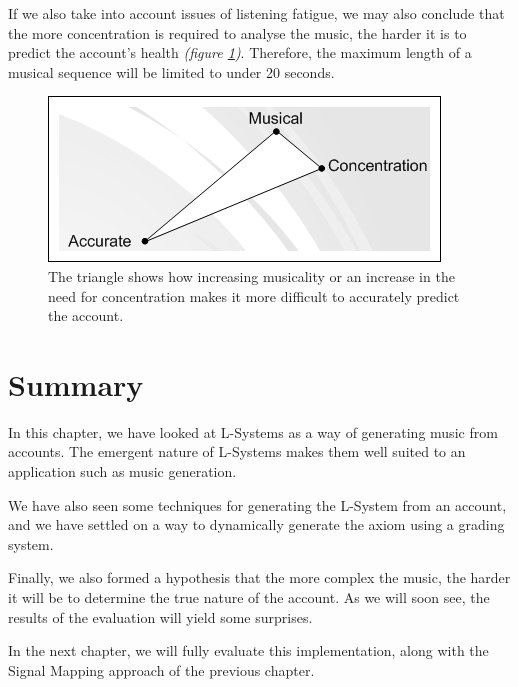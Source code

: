 If we also take into account issues of listening fatigue, we may also conclude that the more concentration is required to analyse the music, the harder it is to predict the account's health \textit{(figure \ref{fig:slider2})}. Therefore, the maximum length of a musical sequence will be limited to under 20 seconds.

\begin{figure}[ht]
\centering
\includegraphics[scale=1.5]{slider2}
\caption{The triangle shows how increasing musicality or an increase in the need for concentration makes it more difficult to accurately predict the account.}
\label{fig:slider2}
\end{figure}


\section{Summary}

In this chapter, we have looked at L-Systems as a way of generating music from accounts. The emergent nature of L-Systems makes them well suited to an application such as music generation.

We have also seen some techniques for generating the L-System from an account, and we have settled on a way to dynamically generate the axiom using a grading system.

Finally, we also formed a hypothesis that the more complex the music, the harder it will be to determine the true nature of the account. As we will soon see, the results of the evaluation will yield some surprises.

In the next chapter, we will fully evaluate this implementation, along with the Signal Mapping approach of the previous chapter.